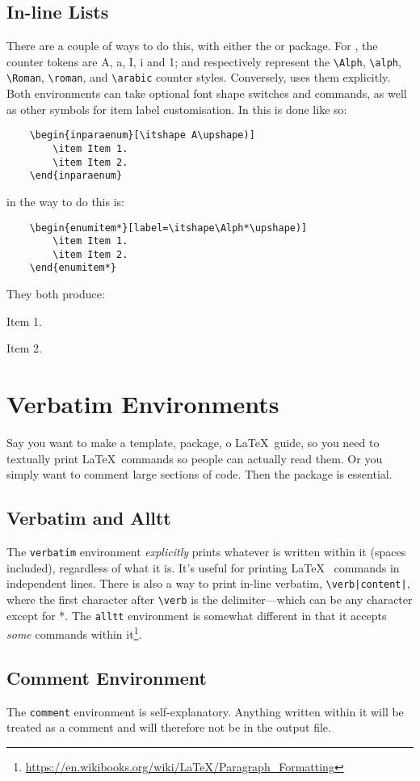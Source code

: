 \subsection{In-line Lists}
%
There are a couple of ways to do this, with either the 
or  package.  For , the counter tokens
are A, a, I, i and 1; and respectively represent the \verb|\Alph|,
\verb|\alph|, \verb|\Roman|, \verb|\roman|, and \verb|\arabic| counter
styles.  Conversely,  uses them explicitly.  Both
environments can take optional font shape switches and commands, as
well as other symbols for item label customisation.  In
 this is done like so:
\begin{verbatim}
	\begin{inparaenum}[\itshape A\upshape)]
	    \item Item 1.
	    \item Item 2.
	\end{inparaenum}
\end{verbatim}
in  the way to do this is:
\begin{verbatim}
	\begin{enumitem*}[label=\itshape\Alph*\upshape)]
	    \item Item 1.
	    \item Item 2.
	\end{enumitem*}
\end{verbatim}
They both produce:
\begin{inparaenum}
\item Item 1.
\item Item 2.
\end{inparaenum}
%
\section{Verbatim Environments}
%
Say you want to make a template, package, o \LaTeX~guide, so you need
to textually print \LaTeX~commands so people can actually read them.
Or you simply want to comment large sections of code.  Then the
 package is essential.
%
\subsection{Verbatim and Alltt}
%
The \verb|verbatim| environment \emph{explicitly} prints whatever is
written within it (spaces included), regardless of what it is.  It's
useful for printing \LaTeX~ commands in independent lines.  There is
also a way to print in-line verbatim, \verb+\verb|content|+, where the
first character after
\verb|\verb| is the delimiter---which can be any character except for *.  The \verb|alltt|
environment is somewhat different in that it accepts \emph{some}
commands within
it\footnote{\url{https://en.wikibooks.org/wiki/LaTeX/Paragraph_Formatting}}.
%
\subsection{Comment Environment}
%
The \verb|comment| environment is self-explanatory.  Anything written
within it will be treated as a comment and will therefore not be in
the output file.
%
